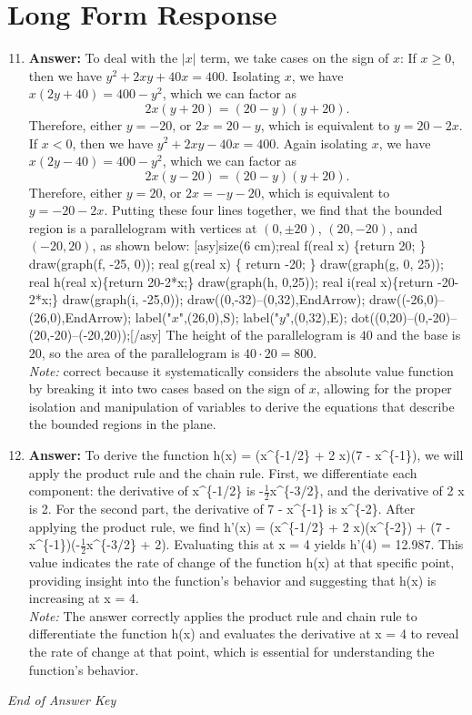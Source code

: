 \documentclass[12pt]{article}
\begin{document}
\section*{Long Form Response}
\begin{enumerate}[label=\arabic*.]
\setcounter{enumi}{10}
\item \textbf{Answer:} To deal with the $|x|$ term, we take cases on the sign of $x$: If $x \ge 0$, then we have $y^2+2 xy+40 x=400$. Isolating $x$, we have $x(2 y+40) = 400-y^2$, which we can factor as \[2 x(y+20) = (20-y)(y+20).\]Therefore, either $y=-20$, or $2 x=20-y$, which is equivalent to $y=20-2 x$. If $x < 0$, then we have $y^2+2 xy-40 x=400$. Again isolating $x$, we have $x(2 y-40) = 400-y^2$, which we can factor as \[2 x(y-20) = (20-y)(y+20).\]Therefore, either $y=20$, or $2 x=-y-20$, which is equivalent to $y=-20-2 x$. Putting these four lines together, we find that the bounded region is a parallelogram with vertices at $(0, \pm 20)$, $(20, -20)$, and $(-20, 20)$, as shown below: [asy]size(6 cm);real f(real x) \{return 20; \} draw(graph(f, -25, 0)); real g(real x) \{ return -20; \} draw(graph(g, 0, 25)); real h(real x)\{return 20-2*x;\} draw(graph(h, 0,25)); real i(real x)\{return -20-2*x;\} draw(graph(i, -25,0)); draw((0,-32)--(0,32),EndArrow); draw((-26,0)--(26,0),EndArrow); label("$x$",(26,0),S); label("$y$",(0,32),E); dot((0,20)--(0,-20)--(20,-20)--(-20,20));[/asy] The height of the parallelogram is $40$ and the base is $20$, so the area of the parallelogram is $40 \cdot 20 = \boxed{800}$.
\\ \textit{Note:} correct because it systematically considers the absolute value function by breaking it into two cases based on the sign of \( x \), allowing for the proper isolation and manipulation of variables to derive the equations that describe the bounded regions in the plane.
\item \textbf{Answer:} To derive the function h(x) = (x^\{-1/2\} + 2 x)(7 - x^\{-1\}), we will apply the product rule and the chain rule. First, we differentiate each component: the derivative of x^\{-1/2\} is -\ensuremath{\frac{1}{2}}x^\{-3/2\}, and the derivative of 2 x is 2. For the second part, the derivative of 7 - x^\{-1\} is x^\{-2\}. After applying the product rule, we find h'(x) = (x^\{-1/2\} + 2 x)(x^\{-2\}) + (7 - x^\{-1\})(-\ensuremath{\frac{1}{2}}x^\{-3/2\} + 2). Evaluating this at x = 4 yields h'(4) = 12.987. This value indicates the rate of change of the function h(x) at that specific point, providing insight into the function's behavior and suggesting that h(x) is increasing at x = 4.
\\ \textit{Note:} The answer correctly applies the product rule and chain rule to differentiate the function h(x) and evaluates the derivative at x = 4 to reveal the rate of change at that point, which is essential for understanding the function's behavior.
\end{enumerate}

\vfill
\noindent\textit{End of Answer Key}
\end{document}
